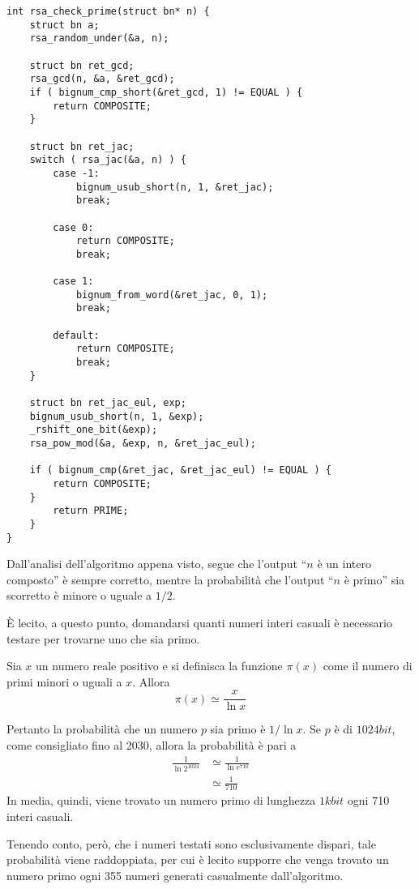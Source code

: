 \begin{lstlisting}[basicstyle=\ttfamily\small, backgroundcolor=\color{bgCode}]
int rsa_check_prime(struct bn* n) {
    struct bn a;
    rsa_random_under(&a, n);
    
    struct bn ret_gcd;
    rsa_gcd(n, &a, &ret_gcd);
    if ( bignum_cmp_short(&ret_gcd, 1) != EQUAL ) {
        return COMPOSITE;
    }

    struct bn ret_jac;
    switch ( rsa_jac(&a, n) ) {
        case -1:
            bignum_usub_short(n, 1, &ret_jac);
            break;
        
        case 0:
            return COMPOSITE;
            break;
        
        case 1:
            bignum_from_word(&ret_jac, 0, 1);
            break;
        
        default:
            return COMPOSITE;
            break;
    }

    struct bn ret_jac_eul, exp;
    bignum_usub_short(n, 1, &exp);
    _rshift_one_bit(&exp);
    rsa_pow_mod(&a, &exp, n, &ret_jac_eul);

    if ( bignum_cmp(&ret_jac, &ret_jac_eul) != EQUAL ) {
        return COMPOSITE;
    }
        return PRIME;
    }
}
\end{lstlisting}

Dall'analisi dell'algoritmo appena visto, segue che l'output ``$n$ è un intero composto'' è sempre corretto, mentre la probabilità che l'output ``$n$ è primo'' sia scorretto è minore o uguale a $1/2$.

È lecito, a questo punto, domandarsi quanti numeri interi casuali è necessario testare per trovarne uno che sia primo. 

\begin{teorema}
	Sia $x$ un numero reale positivo e si definisca la funzione $\pi\left( x \right)$ come il numero di primi minori o uguali a $x$.
	Allora \[ \pi\left( x \right) \simeq \frac{x}{\ln x} \]
\end{teorema}

Pertanto la probabilità che un numero $p$ sia primo è $1/\ln x$. Se $p$ è di $1024bit$, come consigliato fino al 2030, allora la probabilità è pari a 
\begin{align*}
	\frac{1}{\ln 2^{1024}} &\simeq \frac{1}{\ln e^{710}} \\
	&\simeq \frac{1}{710} 
\end{align*}
In media, quindi, viene trovato un numero primo di lunghezza $1kbit$ ogni 710 interi casuali.

Tenendo conto, però, che i numeri testati sono esclusivamente dispari, tale probabilità viene raddoppiata, per cui è lecito supporre che venga trovato un numero primo ogni 355 numeri generati casualmente dall'algoritmo.






































